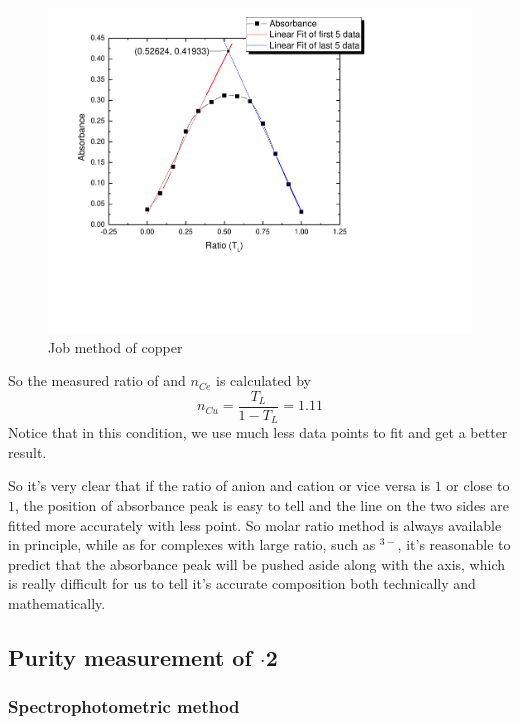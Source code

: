 \begin{figure}[H]
	\includegraphics[width=\linewidth]{copper.pdf}
	\caption{Job method of copper}
	\label{copper}
\end{figure}

So the measured ratio of  and  $n_{Ce}$ is calculated by$$n_{Cu}=\frac{T_L}{1-T_L}=1.11$$Notice that in this condition, we use much less data points to fit and get a better result.

So it's very clear that if the ratio of anion and cation or vice versa is $1$ or close to $1$, the position of absorbance peak is easy to tell and the line on the two sides are fitted more accurately with less point. So molar ratio method is always available in principle, while as for complexes with large ratio, such as \ce{[Fe(CN)6]}$^{3-}$, it's reasonable to predict that the absorbance peak will be pushed aside along with the axis, which is really difficult for us to tell it's accurate composition both technically and mathematically.


\subsection{Purity measurement of $\cdot$2}

\subsubsection{Spectrophotometric method}

